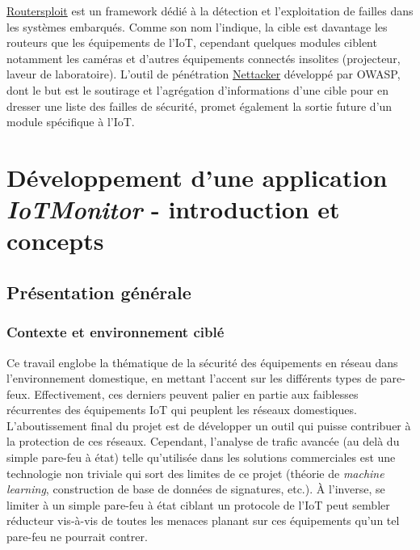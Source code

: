 \documentclass[]{article}
\begin{document}
\par \href{https://github.com/threat9/routersploit}{Routersploit} est un framework dédié à la détection et l'exploitation de failles dans les systèmes embarqués. Comme son nom l'indique, la cible est davantage les routeurs que les équipements de l'IoT, cependant quelques modules ciblent notamment les caméras et d'autres équipements connectés insolites (projecteur, laveur de laboratoire). L'outil de pénétration \href{https://github.com/zdresearch/OWASP-Nettacker}{Nettacker} développé par OWASP, dont le but est le soutirage et l'agrégation d'informations d'une cible pour en dresser une liste des failles de sécurité, promet également la sortie future d'un module spécifique à l'IoT.





\newpage

\section{Développement d'une application \textit{IoTMonitor} - introduction et concepts}
\subsection{Présentation générale}

\subsubsection{Contexte et environnement ciblé}

Ce travail englobe la thématique de la sécurité des équipements en réseau dans l'environnement domestique, en mettant l'accent sur les différents types de pare-feux. Effectivement, ces derniers peuvent palier en partie aux faiblesses récurrentes des équipements IoT qui peuplent les réseaux domestiques. L'aboutissement final du projet est de développer un outil qui puisse contribuer à la protection de ces réseaux. Cependant, l'analyse de trafic avancée (au delà du simple pare-feu à état) telle qu'utilisée dans les solutions commerciales est une technologie non triviale qui sort des limites de ce projet (théorie de \textit{machine learning}, construction de base de données de signatures, etc.). À l'inverse, se limiter à un simple pare-feu à état ciblant un protocole de l'IoT peut sembler réducteur vis-à-vis de toutes les menaces planant sur ces équipements qu'un tel pare-feu ne pourrait contrer.\\
\end{document}
